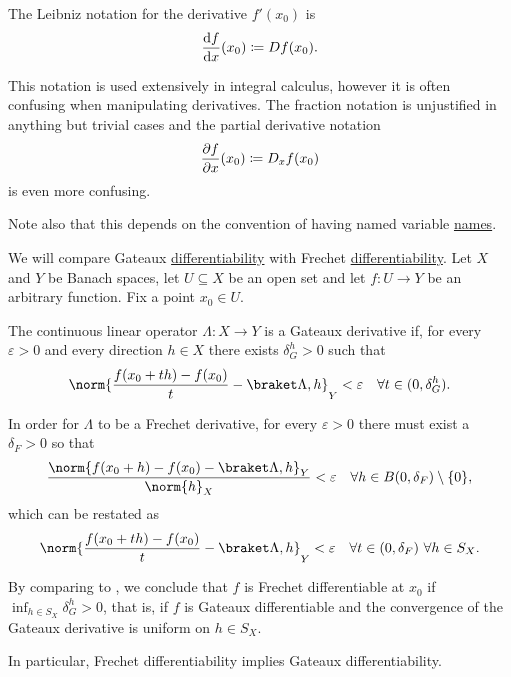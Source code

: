 \begin{remark}
\begin{remenum}
     The Leibniz notation for the derivative \( f'(x_0) \) is
    \begin{equation*}
      \diff f x (x_0) \coloneqq D f(x_0).
    \end{equation*}

    This notation is used extensively in integral calculus, however it is often confusing when manipulating derivatives. The fraction notation is unjustified in anything but trivial cases and the partial derivative notation
    \begin{equation*}
      \diffp f x (x_0) \coloneqq D_x f(x_0)
    \end{equation*}
    is even more confusing.

    Note also that this depends on the convention of having named variable \hyperref[def:function/argument]{names}.
  \end{remenum}
\end{remark}

\begin{remark}\label{rem:gateaux_vs_frechet}
  We will compare Gateaux \hyperref[def:differentiability/gateaux]{differentiability} with Frechet \hyperref[def:differentiability/frechet]{differentiability}. Let \( X \) and \( Y \) be Banach spaces, let \( U \subseteq X \) be an open set and let \( f: U \to Y \) be an arbitrary function. Fix a point \( x_0 \in U \).

  The continuous linear operator \( \Lambda: X \to Y \) is a Gateaux derivative if, for every \( \varepsilon > 0 \) and every direction \( h \in X \) there exists \( \delta_G^h > 0 \) such that
  \begin{equation}\label{rem:gateaux_vs_frechet/gateaux}
    \norm{\frac {f(x_0 + th) - f(x_0)} t - \inner \Lambda h}_Y < \varepsilon \quad\forall t \in (0, \delta_G^h).
  \end{equation}

  In order for \( \Lambda \) to be a Frechet derivative, for every \( \varepsilon > 0 \) there must exist a \( \delta_F > 0 \) so that
  \begin{equation*}
    \frac{\norm{f(x_0 + h) - f(x_0) - \inner \Lambda h}_Y} {\norm{h}_X} < \varepsilon \quad\forall h \in B(0, \delta_F) \setminus \{ 0 \},
  \end{equation*}
  which can be restated as
  \begin{equation}\label{rem:gateaux_vs_frechet/frechet}
    \norm{\frac {f(x_0 + th) - f(x_0)} t - \inner \Lambda h}_Y < \varepsilon \quad\forall t \in (0, \delta_F) \ \forall h \in S_X.
  \end{equation}

  By comparing  to , we conclude that \( f \) is Frechet differentiable at \( x_0 \) if \( \inf_{h \in S_X} \delta^h_G > 0 \), that is, if \( f \) is Gateaux differentiable and the convergence of the Gateaux derivative is uniform on \( h \in S_X \).

  In particular, Frechet differentiability implies Gateaux differentiability.
\end{remark}
